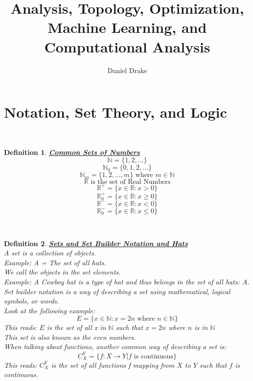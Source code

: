 \documentclass[12pt]{extarticle}
\title{Analysis, Topology, Optimization, Machine Learning, and Computational Analysis}
\author{Daniel Drake}
\theoremstyle{plain}
\theoremstyle{plain}
\theoremstyle{plain}
\theoremstyle{Definition}
\newtheorem{def.}{Definition}[section]
\theoremstyle{Definition}
\theoremstyle{plain}
\theoremstyle{plain}
\newcommand{\cut}[0]{\noindent\framebox[\linewidth]{\rule{\linewidth}{2pt}}\\}
\begin{document}
\maketitle			
\section{Notation, Set Theory, and Logic}
\cut
\begin{def.} \underline{\textbf{Common Sets of Numbers}} \\ 
	$$\mathbb{N} = \{1,2,...\}$$	
	$$\mathbb{N}_0 = \{0,1,2,...\}$$
	$$\mathbb{N}_m = \{1,2,...,m\} \text{ where } m \in \mathbb{N}$$
	$$\mathbb{R} \text{ is the set of Real Numbers}$$
	$$\mathbb{R}^+ = \{x \in \mathbb{R} : x > 0\}$$
	$$\mathbb{R}_0^+ = \{x \in \mathbb{R} : x \geq 0\}$$
	$$\mathbb{R}^- = \{x \in \mathbb{R} : x < 0\}$$
	$$\mathbb{R}_0^- = \{x \in \mathbb{R} : x \leq 0\}$$
\end{def.}
\cut
\begin{def.} \underline{\textbf{Sets and Set Builder Notation and Hats}} \\ 
	A set is a collection of objects. \\ 
	Example: A = The set of all hats. \\ 
	We call the objects in the set elements. \\ 
	Example: A Cowboy hat is a type of hat and thus belongs in the set of all hats: A. \\
	
	Set builder notation is a way of describing a set using mathematical, logical symbols, or words. \\
	Look at the following example: \\ 
	$$E = \{x \in \mathbb{N}: x = 2n \text{ where } n \in \mathbb{N}\}$$
	This reads: $E$ is the set of all x in $\mathbb{N}$ such that $x = 2n$ where $n$ is in $\mathbb{N}$ \\
	This set is also known as the even numbers. \\
	When talking about functions, another common way of describing a set is: 
	$$C_X^Y = \{f : X \to Y | f \text{ is continuous} \}$$
	This reads: $C_X^Y$ is the set of all functions f mapping from $X$ to $Y$ such that $f$ is continuous. 
\end{def.}
\cut
\end{document}
